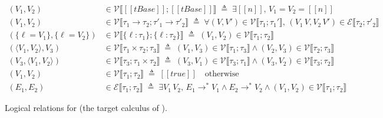 \begin{figure}
\begin{small}
\begin{align*}
  (V_1, V_2) &\in \mathcal{V} \llbracket [[tBase]]; [[tBase]] \rrbracket \; \triangleq \; \exists [[n]],\, V_1 = V_2 = [[n]] \\
  (V_1, V_2) &\in \mathcal{V} \llbracket \tau_1 \rightarrow \tau_2; \tau'_1 \rightarrow \tau'_2 \rrbracket \; \triangleq \; \forall (V, V') \in \mathcal{V} \llbracket \tau_1; \tau_1' \rrbracket,\, (V_1\,V, V_2\,V') \in \mathcal{E} \llbracket \tau_2; \tau'_2 \rrbracket \\
  (\{\ell = V_1\}, \{\ell = V_2\}) &\in \mathcal{V} \llbracket \{\ell : \tau_1\}; \{\ell : \tau_2\} \rrbracket \; \triangleq \; (V_1, V_2) \in \mathcal{V} \llbracket \tau_1; \tau_2 \rrbracket \\
  (\langle V_1, V_2 \rangle, V_3) &\in \mathcal{V} \llbracket \tau_1 \times \tau_2; \tau_3 \rrbracket \; \triangleq \; (V_1, V_3) \in \mathcal{V} \llbracket \tau_1; \tau_3 \rrbracket \land (V_2, V_3) \in \mathcal{V} \llbracket \tau_2; \tau_3 \rrbracket \\
  (V_3, \langle V_1, V_2 \rangle) &\in \mathcal{V} \llbracket \tau_3; \tau_1 \times \tau_2 \rrbracket \; \triangleq \; (V_3, V_1) \in \mathcal{V} \llbracket \tau_3; \tau_1 \rrbracket \land (V_3, V_2) \in \mathcal{V} \llbracket \tau_3; \tau_2 \rrbracket \\
  (V_1, V_2) &\in \mathcal{V} \llbracket \tau_1; \tau_2 \rrbracket \; \triangleq \; [[true]] \quad \text{otherwise} \\
  (E_1, E_2) &\in \mathcal{E} \llbracket \tau_1; \tau_2 \rrbracket \; \triangleq \; \exists V_1\,V_2,\, E_1 \! \rightarrow^* \! V_1 \land E_2 \! \rightarrow^* \! V_2 \land (V_1, V_2) \in \mathcal{V} \llbracket \tau_1; \tau_2 \rrbracket
\end{align*}
\end{small}
\caption{Logical relations for \lambdac (the target calculus of \necolus).}\label{fig:logical-rel-lc}
\end{figure}


